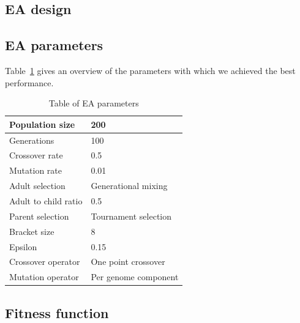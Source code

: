 \documentclass[twoside]{article}
\begin{document}
\begin{multicols}{2} %

  \section{EA design}

  \subsection{EA parameters}

  Table~\ref{tbl:ea-parameters} gives an overview of the parameters with which we achieved the best performance.

  \begin{table}[H]
    \begin{tabular}{|l|l|}
      \hline
      Population size                   & 200                  \\ \hline
      Generations                       & 100                  \\ \hline
      Crossover rate                    & 0.5                  \\ \hline
      Mutation rate                     & 0.01                 \\ \hline
      Adult selection                   & Generational mixing  \\ \hline
      Adult to child ratio              & 0.5                  \\ \hline
      Parent selection                  & Tournament selection \\ \hline
      Bracket size                      & 8                    \\ \hline
      Epsilon                           & 0.15                 \\ \hline
      Crossover operator                & One point crossover  \\ \hline
      Mutation operator                 & Per genome component \\ \hline
    \end{tabular}
    \caption{Table of EA parameters}
    \label{tbl:ea-parameters}
  \end{table}



  \subsection{Fitness function}


\end{multicols}
\end{document}
